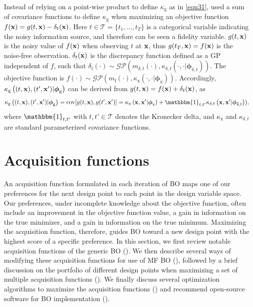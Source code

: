 \documentclass[journal ]{new-aiaa}
\begin{document}
	Instead of relying on a point-wise product to define $\kappa_\text{g}$ as in \cref{eqn31}, \citet{Poloczek2017} used a sum of covariance functions to define $\kappa_\text{g}$ when maximizing an objective function $f({\bf x}) = g(t,{\bf x}) - \delta_t({\bf x})$.
	Here $t \in \mathcal{T} = \{t_1,\dots,t_T\}$ is a categorical variable indicating the noisy information source, and therefore can be seen a fidelity variable.
	$g(t,{\bf x})$ is the noisy value of $f({\bf x})$ when observing $t$ at ${\bf x}$, thus $g(t_T,{\bf x}) = f({\bf x})$ is the noise-free observation.
	$\delta_t({\bf x})$ is the discrepancy function defined as a GP independent of $f$, such that $\delta_t(\cdot) \sim \mathcal{GP}(m_{\delta,t}(\cdot),\kappa_{\delta,t}\left(\cdot,\cdot|{\boldsymbol \phi}_{\delta,t}\right))$.
	The objective function is $f(\cdot) \sim \mathcal{GP}(m_\text{f}(\cdot),\kappa_\text{x}\left(\cdot,\cdot|{\boldsymbol \phi}_\text{x}\right))$.
	Accordingly, $\kappa_\text{g}\left((t,{\bf x}),(t',{\bf x}')|{\boldsymbol \phi}_\text{g}\right)$ can be derived from $g(t,{\bf x}) = f({\bf x}) + \delta_t({\bf x})$, as
	\begin{equation}\label{eqn36}
		\kappa_\text{g}\left((t,{\bf x}),(t',{\bf x}')|{\boldsymbol \phi}_\text{g}\right) = \text{cov}[g(t,{\bf x}),g(t',{\bf x}')]
		=\kappa_\text{x}\left({\bf x},{\bf x}'|{\boldsymbol \phi}_\text{x}\right) +  \mathbbm{1}_{t,t'} \kappa_{\delta,t}\left({\bf x},{\bf x}'|{\boldsymbol \phi}_{\delta,t}\right)),
	\end{equation}
	where $\mathbbm{1}_{t,t'}$ with $t,t' \in \mathcal{T}$ denotes the Kronecker delta, and $\kappa_\text{x}$ and $\kappa_{\delta,t}$ are standard parameterized covariance functions.
	
	\section{Acquisition functions}\label{Sec5}
	
	An acquisition function formulated in each iteration of BO maps one of our preferences for the next design point to each point in the design variable space. 
	Our preferences, under incomplete knowledge about the objective function, often include an improvement in the objective function value, a gain in information on the true minimizer, and a gain in information on the true minimum.
	Maximizing the acquisition function, therefore, guides BO toward a new design point with the highest score of a specific preference.
	In this section, we first review notable acquisition functions of the generic BO ().
	We then describe several ways of modifying these acquisition functions for use of MF BO (), followed by a brief discussion on the portfolio of different design points when maximizing a set of multiple acquisition functions ().
	We finally discuss several optimization algorithms to maximize the acquisition functions () and recommend open-source software for BO implementation ().
	
\end{document}
